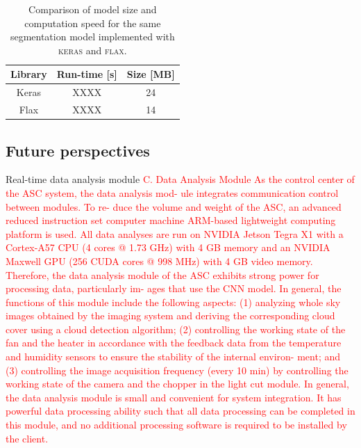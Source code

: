 \documentclass[amt, article]{copernicus}
\begin{document}
\begin{table}[t]
    \begin{center}
        \caption{Comparison of model size and computation speed for the same segmentation model implemented with \textsc{keras} and \textsc{flax}.}
        \begin{tabular}{c c c} 
        \tophline \hline
         Library & Run-time [s] & Size [MB]\\
         \hline
         Keras & XXXX & 24 \\ [1.0ex]
         Flax & XXXX & 14 \\ [1.0ex]
         \hline
        \end{tabular}
        \belowtable{}
        \end{center}
    \end{table}
    

\subsection{Future perspectives}

Real-time data analysis module
\textcolor{red}{C. Data Analysis Module
As the control center of the ASC system, the data analysis mod-
ule integrates communication control between modules. To re-
duce the volume and weight of the ASC, an advanced reduced
instruction set computer machine ARM-based lightweight
computing platform is used. All data analyses are run on
NVIDIA Jetson Tegra X1 with a Cortex-A57 CPU (4 cores
@ 1.73 GHz) with 4 GB memory and an NVIDIA
Maxwell GPU (256 CUDA cores @ 998 MHz) with 4 GB
video memory. Therefore, the data analysis module of the
ASC exhibits strong power for processing data, particularly im-
ages that use the CNN model. In general, the functions of this
module include the following aspects:
(1) analyzing whole sky images obtained by the imaging
system and deriving the corresponding cloud cover using a
cloud detection algorithm;
(2) controlling the working state of the fan and the heater in
accordance with the feedback data from the temperature and
humidity sensors to ensure the stability of the internal environ-
ment; and
(3) controlling the image acquisition frequency (every
10 min) by controlling the working state of the camera and
the chopper in the light cut module.
In general, the data analysis module is small and convenient
for system integration. It has powerful data processing ability
such that all data processing can be completed in this module,
and no additional processing software is required to be installed
by the client.}
\end{document}
